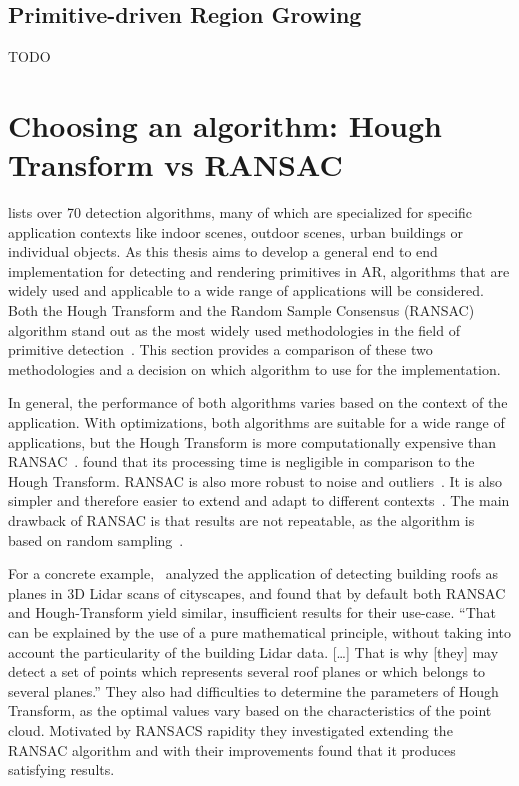 \subsection{Primitive-driven Region Growing}
TODO


\section{Choosing an algorithm: Hough Transform vs RANSAC}\label{sec:choosing-an-algorithm}

\cite{kaiser_survey_2019} lists over 70 detection algorithms, many of which are specialized for specific application contexts
like indoor scenes, outdoor scenes, urban buildings or individual objects.
As this thesis aims to develop a general end to end implementation for detecting and rendering primitives in AR,
algorithms that are widely used and applicable to a wide range of applications will be considered.
Both the Hough Transform and the Random Sample Consensus (RANSAC) algorithm stand out as the
most widely used methodologies in the field of primitive detection~\parencite{schnabel_efficient_2007}.
This section provides a comparison of these two methodologies and a decision on which algorithm to use for the implementation.

In general, the performance of both algorithms varies based on the context of the application.
With optimizations, both algorithms are suitable for a wide range of applications, but
the Hough Transform is more computationally expensive than RANSAC~\parencite{kaiser_survey_2019}.
\cite{tarsha-kurdi_hough-transform_2007} found that its processing time is negligible in comparison to the Hough Transform.
RANSAC is also more robust to noise and outliers~\parencite{kaiser_survey_2019}.
It is also simpler and therefore easier to extend and adapt to different contexts~\parencite{tarsha-kurdi_hough-transform_2007, kaiser_survey_2019}.
The main drawback of RANSAC is that results are not repeatable, as the algorithm is based on random sampling~\parencite{kaiser_survey_2019}.


For a concrete example,~\cite{tarsha-kurdi_hough-transform_2007} analyzed the application of detecting building
roofs as planes in 3D Lidar scans of cityscapes, and found that by default both RANSAC and Hough-Transform yield similar,
insufficient results for their use-case.
“That can be explained by the use of a pure mathematical principle,
without taking into account the particularity of the building Lidar data. […] That is why
[they] may detect a set of points which represents several roof planes or which belongs to several planes.”
They also had difficulties to determine the parameters of Hough Transform,
as the optimal values vary based on the characteristics of the point cloud.
Motivated by RANSACS rapidity they investigated extending the RANSAC algorithm and with their improvements
found that it produces satisfying results.

